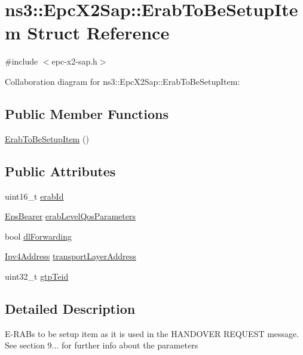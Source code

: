 \hypertarget{structns3_1_1EpcX2Sap_1_1ErabToBeSetupItem}{}\section{ns3\+:\+:Epc\+X2\+Sap\+:\+:Erab\+To\+Be\+Setup\+Item Struct Reference}
\label{structns3_1_1EpcX2Sap_1_1ErabToBeSetupItem}


{\ttfamily \#include $<$epc-\/x2-\/sap.\+h$>$}



Collaboration diagram for ns3\+:\+:Epc\+X2\+Sap\+:\+:Erab\+To\+Be\+Setup\+Item\+:
\subsection*{Public Member Functions}
\begin{DoxyCompactItemize}
\item 
\hyperlink{structns3_1_1EpcX2Sap_1_1ErabToBeSetupItem_ae1f8cc032c3ec0026354e8a3ce141125}{Erab\+To\+Be\+Setup\+Item} ()
\end{DoxyCompactItemize}
\subsection*{Public Attributes}
\begin{DoxyCompactItemize}
\item 
uint16\+\_\+t \hyperlink{structns3_1_1EpcX2Sap_1_1ErabToBeSetupItem_ad59a72b6e684ebc2074a73d03821fa68}{erab\+Id}
\item 
\hyperlink{structns3_1_1EpsBearer}{Eps\+Bearer} \hyperlink{structns3_1_1EpcX2Sap_1_1ErabToBeSetupItem_addb4e7d6b05b3e9365ed230e343cbf0b}{erab\+Level\+Qos\+Parameters}
\item 
bool \hyperlink{structns3_1_1EpcX2Sap_1_1ErabToBeSetupItem_a1d62f1ca7fc60617715e93cc71250ca4}{dl\+Forwarding}
\item 
\hyperlink{classns3_1_1Ipv4Address}{Ipv4\+Address} \hyperlink{structns3_1_1EpcX2Sap_1_1ErabToBeSetupItem_aa50ff6a3143234c9b2e22bbbd7d5b7a9}{transport\+Layer\+Address}
\item 
uint32\+\_\+t \hyperlink{structns3_1_1EpcX2Sap_1_1ErabToBeSetupItem_ad6013b682fcacabf1e94a67c7e21118e}{gtp\+Teid}
\end{DoxyCompactItemize}


\subsection{Detailed Description}
E-\/\+R\+A\+Bs to be setup item as it is used in the H\+A\+N\+D\+O\+V\+ER R\+E\+Q\+U\+E\+ST message. See section 9... for further info about the parameters 

